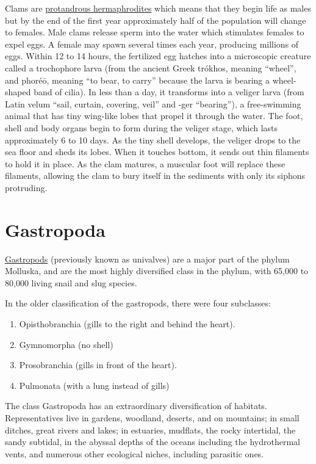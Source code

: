 Clams are
\href{https://en.wikipedia.org/wiki/Sequential_hermaphroditism}{protandrous
hermaphrodites} which means that they begin life as males but by the end
of the first year approximately half of the population will change to
females. Male clams release sperm into the water which stimulates
females to expel eggs. A female may spawn several times each year,
producing millions of eggs. Within 12 to 14 hours, the fertilized egg
hatches into a microscopic creature called a trochophore larva (from the
ancient Greek trókhos, meaning ``wheel'', and phoréō, meaning ``to bear,
to carry'' because the larva is bearing a wheel-shaped band of cilia).
In less than a day, it transforms into a veliger larva (from Latin velum
``sail, curtain, covering, veil'' and -ger ``bearing''), a free-swimming
animal that has tiny wing-like lobes that propel it through the water.
The foot, shell and body organs begin to form during the veliger stage,
which lasts approximately 6 to 10 days. As the tiny shell develops, the
veliger drops to the sea floor and sheds its lobes. When it touches
bottom, it sends out thin filaments to hold it in place. As the clam
matures, a muscular foot will replace these filaments, allowing the clam
to bury itself in the sediments with only its siphons protruding.

\section{Gastropoda}\label{gastropoda}

\href{https://en.wikipedia.org/wiki/Gastropoda}{Gastropods} (previously
known as univalves) are a major part of the phylum Molluska, and are the
most highly diversified class in the phylum, with 65,000 to 80,000
living snail and slug species.

In the older classification of the gastropods, there were four
subclasses:

\begin{enumerate}
\def\labelenumi{\arabic{enumi}.}
\tightlist
\item
  Opisthobranchia (gills to the right and behind the heart).
\item
  Gymnomorpha (no shell)
\item
  Prosobranchia (gills in front of the heart).
\item
  Pulmonata (with a lung instead of gills)
\end{enumerate}

The class Gastropoda has an extraordinary diversification of habitats.
Representatives live in gardens, woodland, deserts, and on mountains; in
small ditches, great rivers and lakes; in estuaries, mudflats, the rocky
intertidal, the sandy subtidal, in the abyssal depths of the oceans
including the hydrothermal vents, and numerous other ecological niches,
including parasitic ones.

